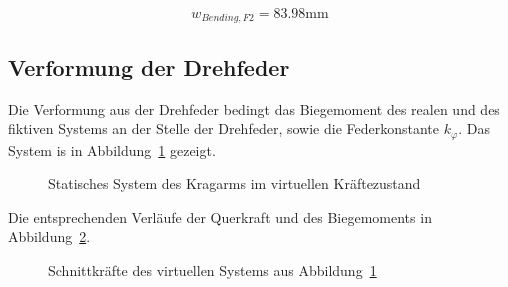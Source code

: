 \documentclass[
  12pt,
  letterpaper,
  egregdoesnotlikesansseriftitles]{scrreprt}
\begin{document}
\begin{equation}w_{Bending,F 2} = 83.98 \text{mm}\end{equation}

\subsection{Verformung der Drehfeder}\label{verformung-der-drehfeder}

Die Verformung aus der Drehfeder bedingt das Biegemoment des realen und
des fiktiven Systems an der Stelle der Drehfeder, sowie die
Federkonstante \(k_\varphi\). Das System is in
Abbildung~\ref{fig-kragarm-sys-virtuell} gezeigt.

\begin{figure}[H]


\caption{\label{fig-kragarm-sys-virtuell}Statisches System des Kragarms
im virtuellen Kräftezustand}

\end{figure}%

Die entsprechenden Verläufe der Querkraft und des Biegemoments in
Abbildung~\ref{fig-sk-kragarm-virtuell}.

\begin{figure}[H]


\caption{\label{fig-sk-kragarm-virtuell}Schnittkräfte des virtuellen
Systems aus Abbildung~\ref{fig-kragarm-sys-virtuell}}

\end{figure}%
\end{document}

